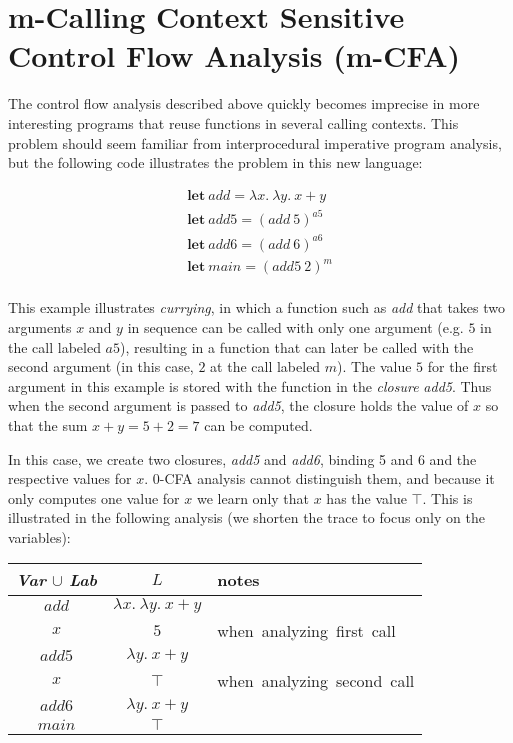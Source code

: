 \documentclass[11pt]{article}
\begin{document}
\section{m-Calling Context Sensitive Control Flow Analysis (m-CFA)}

The control flow analysis described above quickly becomes imprecise in more
interesting programs that reuse functions in several calling contexts. This
problem should seem familiar from interprocedural imperative program analysis,
but the following code illustrates the problem in this new language:

\[
\begin{array}{l}
\textbf{let}~ \textit{add} = \lambda x .~ \lambda y .~ x + y\\
\textbf{let}~ \textit{add5} = (add~ 5)^{a5}\\
\textbf{let}~ \textit{add6} = (add~ 6)^{a6}\\
\textbf{let}~ \textit{main} = (add5~ 2)^{m}\\
\end{array}
\]

This example illustrates \textit{currying}, in which a function such as
\textit{add} that takes two arguments $x$ and $y$ in sequence can be called with
only one argument (e.g. $5$ in the call labeled $a5$), resulting in a function
that can later be called with the second argument (in this case, $2$ at the call
labeled $m$). The value $5$ for the first argument in this example is stored
with the function in the \textit{closure} \textit{add5}. Thus when the second
argument is passed to \textit{add5}, the closure holds the value of $x$ so that
the sum $x+y = 5 + 2 = 7$ can be computed.

In this case, we create two closures, \textit{add5} and \textit{add6},
binding 5 and 6 and the respective values for $x$. 0-CFA 
analysis cannot distinguish them, and 
because it only computes one value for $x$ 
we learn only that $x$ has the value $\top$. This is illustrated in
the following analysis (we shorten the trace to focus only on the
variables):

\tablespace
\begin{tabular}{c | c | l}

\textit{Var} $\cup$ \textit{Lab} & $L$ & notes \\
\hline
$add$ & $\lambda x .~ \lambda y .~ x + y$ \\
$x$ & $5$ & \mbox{when analyzing first call} \\
$add5$ & $\lambda y .~ x + y$ \\
$x$ & $\top$ & \mbox{when analyzing second call} \\
$add6$ & $\lambda y .~ x + y$ \\
$main$ & $\top$ \\
\end{tabular}
\tablespace
\end{document}

